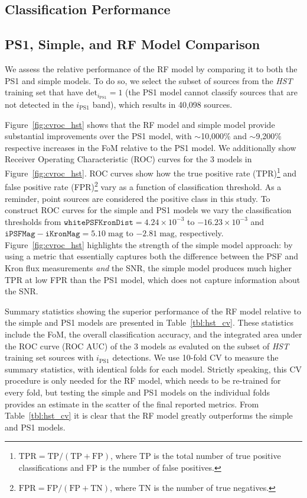 \documentclass[twocolumn, dvipdfmx]{aastex62}
\begin{document}
\begin{CJK*}{UTF8}{gbsn}
\section{Classification Performance}

\subsection{PS1, Simple, and RF Model Comparison}\label{sec:comp_hst}

We assess the relative performance of the RF model by comparing it to both
the PS1 and simple models. To do so, we select the subset of sources from
the \textit{HST} training set that have $\mathrm{det}_{i_\mathrm{PS1}} = 1$
(the PS1 model cannot classify sources that are not detected in the
$i_\mathrm{PS1}$ band), which results in 40,098 sources.

Figure~\ref{fig:cvroc_hst} shows that the RF model and simple model provide
substantial improvements over the PS1 model, with $\sim$10,000\% and
$\sim$9,200\% respective increases in the FoM relative to the PS1 model. We
additionally show Receiver Operating Characteristic (ROC) curves for the 3
models in Figure~\ref{fig:cvroc_hst}. ROC curves show how the true positive
rate (TPR)\footnote{$\mathrm{TPR} = \mathrm{TP}/(\mathrm{TP} +
\mathrm{FP})$, where TP is the total number of true positive classifications
and FP is the number of false positives.} and false positive rate
(FPR)\footnote{$\mathrm{FPR} = \mathrm{FP}/(\mathrm{FP}+\mathrm{TN})$, where
TN is the number of true negatives.} vary as a function of classification
threshold. As a reminder, point sources are considered the positive class in
this study. To construct ROC curves for the simple and PS1 models we vary
the classification thresholds from $\mathtt{whitePSFKronDist} = 4.24\times
10^{-3}$ to $-16.23\times10^{-3}$ and $\mathtt{iPSFMag} - \mathtt{iKronMag}
= 5.10\;\mathrm{mag}$ to $-2.81\;\mathrm{mag}$, respectively.
Figure~\ref{fig:cvroc_hst} highlights the strength of the simple model
approach: by using a metric that essentially captures both the difference
between the PSF and Kron flux measurements \textit{and} the SNR, the simple
model produces much higher TPR at low FPR than the PS1 model, which does not
capture information about the SNR.

Summary statistics showing the superior performance of the RF model relative
to the simple and PS1 models are presented in Table~\ref{tbl:hst_cv}. These
statistics include the FoM, the overall classification accuracy, and the
integrated area under the ROC curve (ROC AUC) of the 3 models as evaluted on
the subset of \textit{HST} training set sources with $i_\mathrm{PS1}$
detections. We use 10-fold CV to measure the summary statistics, with
identical folds for each model. Strictly speaking, this CV procedure is only
needed for the RF model, which needs to be re-trained for every fold, but
testing the simple and PS1 models on the individual folds provides an
estimate in the scatter of the final reported metrics. From
Table~\ref{tbl:hst_cv} it is clear that the RF model greatly outperforms the
simple and PS1 models.



\end{CJK*}
\end{document}
